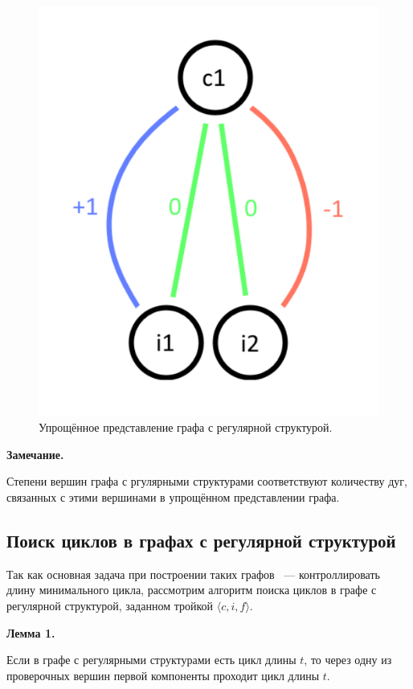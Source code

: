 \documentclass[14pt]{mmcs-article}
\begin{document}
\begin{figure}[H]
  \centering
  \includegraphics[scale=0.4]{Fig_2.png}
  \caption{ Упрощённое представление графа с регулярной структурой. }
  \label{image:2}
\end{figure}

\textbf{Замечание.}

Степени вершин графа с ргулярными структурами соответствуют количеству дуг, связанных с этими вершинами в упрощённом представлении графа.

\subsection{Поиск циклов в графах с регулярной структурой}

Так как основная задача при построении таких графов ~--- контроллировать длину минимального цикла, рассмотрим алгоритм поиска циклов в графе с регулярной структурой, заданном тройкой $\langle c, i, f \rangle$.

\textbf{Лемма 1.}

Если в графе с регулярными структурами есть цикл длины $t$, то через одну из проверочных вершин первой компоненты проходит цикл длины $t$.
\end{document}
